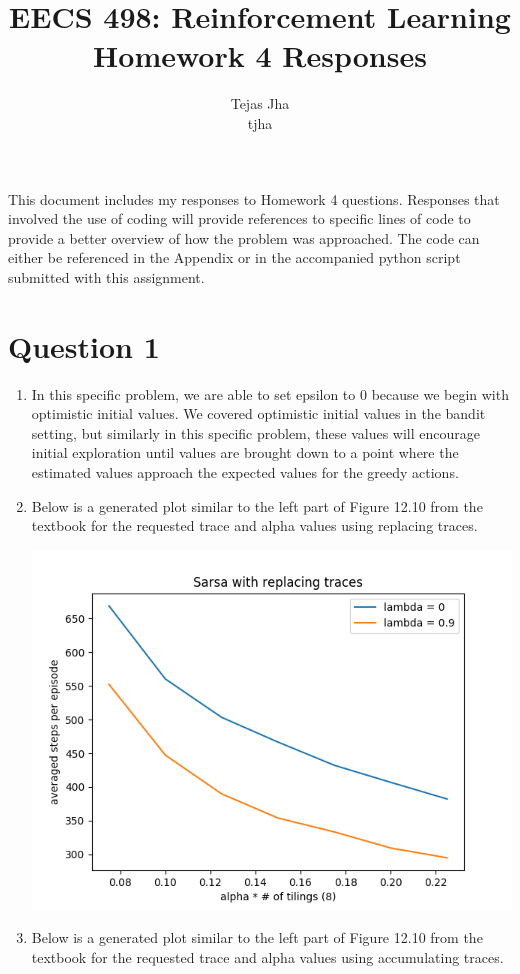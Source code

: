 \documentclass[11pt]{article}
\title{EECS 498: Reinforcement Learning \protect \\ Homework 4 Responses}
\author{Tejas Jha \\ tjha}
\begin{document}
\maketitle
This document includes my responses to Homework 4 questions. Responses that involved the use of coding will provide references to specific lines of code to provide a better overview of how the problem was approached. The code can either be referenced in the Appendix or in the accompanied python script submitted with this assignment.

\section*{Question 1}
\begin{enumerate}[label=(\alph*)]
\item
In this specific problem, we are able to set epsilon to 0 because we begin with optimistic initial values. We covered optimistic initial values in the bandit setting, but similarly in this specific problem, these values will encourage initial exploration until values are brought down to a point where the estimated values approach the expected values for the greedy actions.

\item
Below is a generated plot similar to the left part of Figure 12.10 from the textbook for the requested trace and alpha values using replacing traces.

\includegraphics[scale=0.8]{replacing_traces.png}

\item
Below is a generated plot similar to the left part of Figure 12.10 from the textbook for the requested trace and alpha values using accumulating traces.


\end{enumerate}
\end{document}

